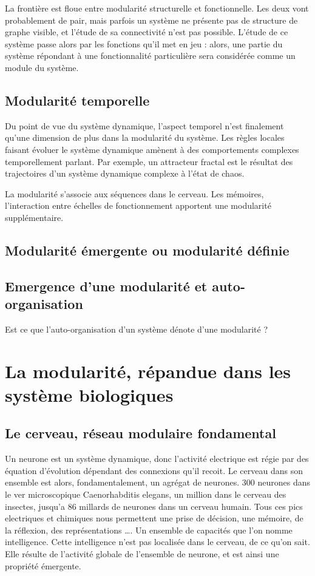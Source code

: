 La frontière est floue entre modularité structurelle et fonctionnelle. Les deux vont probablement de pair, mais parfois un système ne présente pas de structure de graphe visible, et l'étude de sa connectivité n'est pas possible. L'étude de ce système passe alors par les fonctions qu'il met en jeu : alors, une partie du système répondant à une fonctionnalité particulière sera considérée comme un module du système. 


\subsection{Modularité temporelle}

Du point de vue du système dynamique, l'aspect temporel n'est finalement qu'une dimension de plus dans la modularité du système. Les règles locales faisant évoluer le système dynamique amènent à des comportements complexes temporellement parlant. Par exemple, un attracteur fractal est le résultat des trajectoires d'un système dynamique complexe à l'état de chaos. 

La modularité s'associe aux séquences dans le cerveau. Les mémoires, l'interaction entre échelles de fonctionnement apportent une modularité supplémentaire.

\subsection{Modularité émergente ou modularité définie}

\subsection{Emergence d'une modularité et auto-organisation}

Est ce que l'auto-organisation d'un système dénote d'une modularité ? 


\section{La modularité, répandue dans les système biologiques}

\subsection{Le cerveau, réseau modulaire fondamental}

Un neurone est un système dynamique, donc l’activité electrique est régie par des équation d’évolution dépendant des connexions qu’il recoit. Le cerveau dans son ensemble est alors,  fondamentalement, un agrégat de neurones. 300 neurones dans le ver microscopique  Caenorhabditis elegans, un million dans le cerveau des insectes, jusqu’a 86 millards de neurones dans un cerveau humain. Tous ces pics electriques et chimiques nous permettent une prise de décision, une mémoire, de la réflexion, des représentations …. Un ensemble de capacités que l’on nomme intelligence. Cette intelligence n’est pas localisée dans le cerveau, de ce qu’on sait. Elle résulte de l’activité globale de l’ensemble de neurone, et est ainsi une propriété émergente. 

